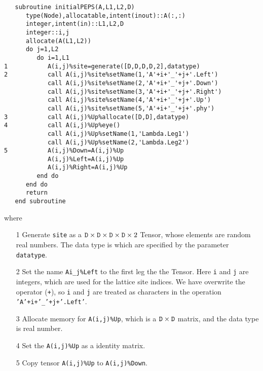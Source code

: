 \documentclass[preprint,3p,times,preprint,showpacs,amsmath,superscriptaddress,floatfix]{elsarticle}
\begin{document}
\begin{verbatim}
   subroutine initialPEPS(A,L1,L2,D)
      type(Node),allocatable,intent(inout)::A(:,:)
      integer,intent(in)::L1,L2,D
      integer::i,j
      allocate(A(L1,L2))
      do j=1,L2
         do i=1,L1
1           A(i,j)%site=generate([D,D,D,D,2],datatype)
2           call A(i,j)%site%setName(1,'A'+i+'_'+j+'.Left')
            call A(i,j)%site%setName(2,'A'+i+'_'+j+'.Down')
            call A(i,j)%site%setName(3,'A'+i+'_'+j+'.Right')
            call A(i,j)%site%setName(4,'A'+i+'_'+j+'.Up')
            call A(i,j)%site%setName(5,'A'+i+'_'+j+'.phy')
3           call A(i,j)%Up%allocate([D,D],datatype)
4           call A(i,j)%Up%eye()
            call A(i,j)%Up%setName(1,'Lambda.Leg1')
            call A(i,j)%Up%setName(2,'Lambda.Leg2')
5           A(i,j)%Down=A(i,j)%Up
            A(i,j)%Left=A(i,j)%Up
            A(i,j)%Right=A(i,j)%Up
         end do
      end do
      return
   end subroutine

\end{verbatim}
where
\begin{enumerate}
	\item[1] Generate {\tt site} as a ${\tt D}\times {\tt D}\times {\tt D}\times {\tt D}\times 2$ Tensor, whose elements are random real numbers. The data type is which are specified by the parameter {\tt datatype}.
	\item[2] Set the name {\tt Ai\_j\%Left} to the first leg the the Tensor.  Here {\tt i} and {\tt j} are integers, which are used for the lattice site indices. We have overwrite the operator ({\tt +}), so {\tt i} and {\tt j} are treated as characters in the operation {\tt 'A'+i+'\_'+j+'.Left'}.
	\item[3] Allocate memory for {\tt A(i,j)\%Up}, which is a  ${\tt D} \times {\tt D}$ matrix, and the data type is real number.
	\item[4] Set the {\tt A(i,j)\%Up} as a identity matrix.
    \item[5] Copy tensor {\tt A(i,j)\%Up} to {\tt A(i,j)\%Down}.
\end{enumerate}
\end{document}
